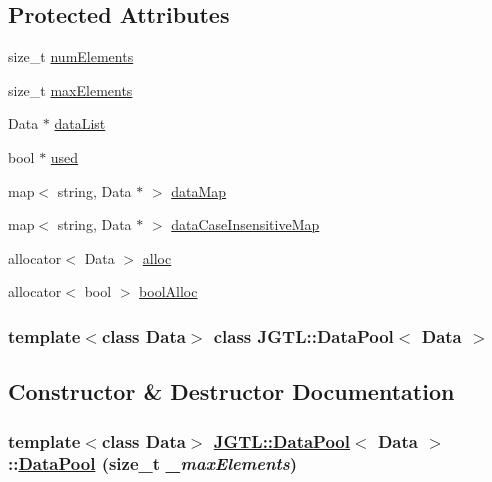 \subsection*{Protected Attributes}
\begin{CompactItemize}
\item 
size\_\-t \hyperlink{class_j_g_t_l_1_1_data_pool_9212d2d6361f7899c7466d283da57348}{num\-Elements}
\item 
size\_\-t \hyperlink{class_j_g_t_l_1_1_data_pool_719aa8582f73c25d5a8b2d99b965c108}{max\-Elements}
\item 
Data $\ast$ \hyperlink{class_j_g_t_l_1_1_data_pool_483eef3daa9591762461688b095698e9}{data\-List}
\item 
bool $\ast$ \hyperlink{class_j_g_t_l_1_1_data_pool_c9f0500553ee7ffc10d526738c2691f2}{used}
\item 
map$<$ string, Data $\ast$ $>$ \hyperlink{class_j_g_t_l_1_1_data_pool_1ae3a6d7344f663a81bd4b8f114943fa}{data\-Map}
\item 
map$<$ string, Data $\ast$ $>$ \hyperlink{class_j_g_t_l_1_1_data_pool_e317f4950f8e4327198cd55bd49445d8}{data\-Case\-Insensitive\-Map}
\item 
allocator$<$ Data $>$ \hyperlink{class_j_g_t_l_1_1_data_pool_659a9784d3dd8b8096d56f6e42403869}{alloc}
\item 
allocator$<$ bool $>$ \hyperlink{class_j_g_t_l_1_1_data_pool_24aa967e3f726dc688a089ac3ee2d3e5}{bool\-Alloc}
\end{CompactItemize}
\subsubsection*{template$<$class Data$>$ class JGTL::Data\-Pool$<$ Data $>$}



\subsection{Constructor \& Destructor Documentation}
\hypertarget{class_j_g_t_l_1_1_data_pool_31db1e354783d6464e3ee91f6844a115}{
\subsubsection[DataPool]{\setlength{\rightskip}{0pt plus 5cm}template$<$class Data$>$ \hyperlink{class_j_g_t_l_1_1_data_pool}{JGTL::Data\-Pool}$<$ Data $>$::\hyperlink{class_j_g_t_l_1_1_data_pool}{Data\-Pool} (size\_\-t {\em \_\-max\-Elements})}}
\label{class_j_g_t_l_1_1_data_pool_31db1e354783d6464e3ee91f6844a115}


